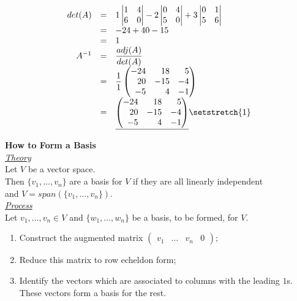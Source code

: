 \documentclass[11pt,a4paper]{article}
\begin{document}
\[\begin{array}{rcl}
  det(A) &=& 1\begin{vmatrix} 1 & 4 \\ 6 & 0\end{vmatrix} -2\begin{vmatrix}0 & 4 \\ 5 & 0 \end{vmatrix} +3\begin{vmatrix}0&1\\5&6 \end{vmatrix}\\
  &=& -24+40-15\\
  &=& 1\\
  A^{-1} &=& \displaystyle{\frac{adj(A)}{det(A)}}\\
  &=& \displaystyle{\frac{1}{1}\begin{pmatrix*}[r] -24 & 18 & 5 \\ 20 & -15 & -4 \\ -5 & 4 & -1 \end{pmatrix*}}\\
  &=& \underline{\begin{pmatrix*}[r] -24 & 18 & 5 \\ 20 & -15 & -4 \\ -5 & 4 & -1 \end{pmatrix*}}
\setstretch{1}\end{array}\]

\textbf{How to Form a Basis}\\

\underline{\textit{Theory}}\\
Let $V$ be a vector space.\\
Then $\{ v_1, \dots, v_n\}$ are a basis for $V$ if they are all linearly independent\\ and $V = span(\{v_1, \dots, v_n\})$.\\

\underline{\textit{Process}}\\
Let $v_1, \dots , v_n \in V$ and $\{ w_1, \dots , w_n\}$ be a basis, to be formed, for $V$.
\begin{enumerate}[label=\roman*)]
  \itemsep0em
  \item Construct the augmented matrix $\begin{pmatrix} v_1 & \dots & v_n & 0 \end{pmatrix}$;
  \item Reduce this matrix to row echeldon form;
  \item Identify the vectors which are associated to columns with the leading $1$s. These vectors form a basis for the rest.
\end{enumerate}
\end{document}
